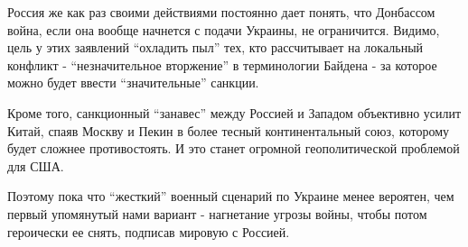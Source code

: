 Россия же как раз своими действиями постоянно дает понять, что Донбассом война,
если она вообще начнется с подачи Украины, не ограничится. Видимо, цель у этих
заявлений \enquote{охладить пыл} тех, кто рассчитывает на локальный конфликт -
\enquote{незначительное вторжение} в терминологии Байдена - за которое можно
будет ввести \enquote{значительные} санкции. 

Кроме того, санкционный \enquote{занавес} между Россией и Западом объективно
усилит Китай, спаяв Москву и Пекин в более тесный континентальный союз,
которому будет сложнее противостоять. И это станет огромной геополитической
проблемой для США. 

Поэтому пока что \enquote{жесткий} военный сценарий по Украине менее вероятен,
чем первый упомянутый нами вариант - нагнетание угрозы войны, чтобы потом
героически ее снять, подписав мировую с Россией. 
